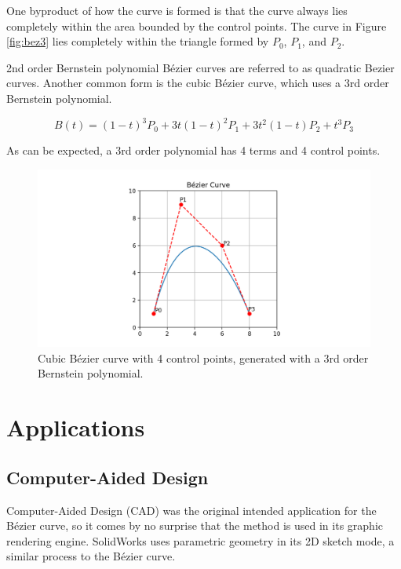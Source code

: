 \documentclass[12pt,letterpaper]{article}
\begin{document}
One byproduct of how the curve is formed is that the curve always lies completely within the area bounded by the control points. The curve in Figure \ref{fig:bez3} lies completely within the triangle formed by $P_0$, $P_1$, and $P_2$.

2nd order Bernstein polynomial B\'ezier curves are referred to as quadratic Bezier curves. Another common form is the cubic B\'ezier curve, which uses a 3rd order Bernstein polynomial.

$$B(t)=(1-t)^3 P_0+3t (1-t)^2 P_1+3t^2 (1-t) P_2+t^3 P_3$$

As can be expected, a 3rd order polynomial has 4 terms and 4 control points.

\begin{figure}[H]
    \centering
    \includegraphics[width=15cm]{Figure_5}
    \caption{Cubic B\'ezier curve with 4 control points, generated with a 3rd order Bernstein polynomial.}
    \label{fig:bez4}
\end{figure}

\section{Applications}

\subsection{Computer-Aided Design}

Computer-Aided Design (CAD) was the original intended application for the B\'ezier curve, so it comes by no surprise that the method is used in its graphic rendering engine. SolidWorks uses parametric geometry in its 2D sketch mode, a similar process to the B\'ezier curve. 

\end{document}
